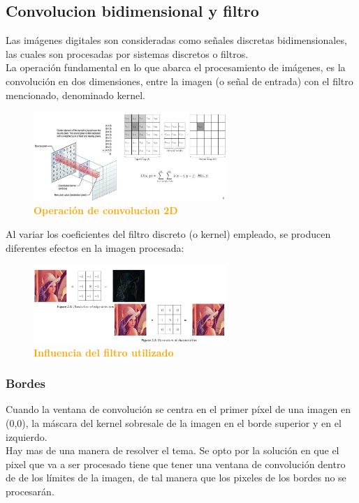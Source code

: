 \documentclass{article}
\begin{document}
\subsection{Convolucion bidimensional y filtro}
Las imágenes digitales son consideradas como señales discretas bidimensionales, las cuales son procesadas por sistemas discretos o filtros. \\
La operación fundamental en lo que abarca el procesamiento de imágenes, es la convolución en dos dimensiones, entre la imagen (o señal de entrada) con el filtro mencionado, denominado kernel.\\
  \begin{figure}[H]
    \centering
      \includegraphics[width=0.65\textwidth]{figures/CONV.jpg}
       \centering
       \caption{\textbf{\textcolor{Orange}{Operación de convolucion 2D}}}\label{fig:1}
    \end{figure}
    
Al variar los coeficientes del filtro discreto (o kernel) empleado, se producen diferentes efectos en la imagen procesada:
  \begin{figure}[H]
    \centering
      \includegraphics[width=0.65\textwidth]{figures/CONV2.jpg}
       \centering
       \caption{\textbf{\textcolor{Orange}{Influencia del filtro utilizado}}}\label{fig:1}
    \end{figure}
\subsubsection{Bordes}
Cuando la ventana de convolución se centra en el primer píxel de una imagen en (0,0), la máscara del kernel sobresale de la imagen en el borde superior y en el izquierdo.\\
Hay mas de una manera de resolver el tema. Se opto por la solución en que el pixel que va a ser procesado tiene que tener una ventana de convolución dentro de de los límites de la imagen, de tal manera que los pixeles de los bordes no se procesarán.\\
\clearpage
\end{document}
